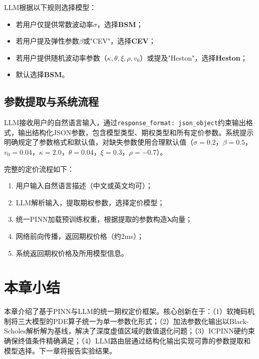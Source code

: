 LLM根据以下规则选择模型：
\begin{itemize}
  \item 若用户仅提供常数波动率$\sigma$，选择\textbf{BSM}；
  \item 若用户提及弹性参数$\beta$或"CEV"，选择\textbf{CEV}；
  \item 若用户提供随机波动率参数（$\kappa,\theta,\xi,\rho,v_0$）或提及"Heston"，选择\textbf{Heston}；
  \item 默认选择\textbf{BSM}。
\end{itemize}

\subsection{参数提取与系统流程}

LLM接收用户的自然语言输入，通过\texttt{response\_format: json\_object}约束输出格式，输出结构化JSON参数，包含模型类型、期权类型和所有定价参数。系统提示明确规定了参数格式和默认值，对缺失参数使用合理默认值（$\sigma=0.2$，$\beta=0.5$，$v_0=0.04$，$\kappa=2.0$，$\theta=0.04$，$\xi=0.3$，$\rho=-0.7$）。

完整的定价流程如下：
\begin{enumerate}
  \item 用户输入自然语言描述（中文或英文均可）；
  \item LLM解析输入，提取期权参数，选择定价模型；
  \item 统一PINN加载预训练权重，根据提取的参数构造$\boldsymbol{\lambda}$向量；
  \item 网络前向传播，返回期权价格（约2ms）；
  \item 系统返回期权价格及所用模型信息。
\end{enumerate}

\section{本章小结}\label{sec:method_summary}

本章介绍了基于PINN与LLM的统一期权定价框架。核心创新在于：（1）软掩码机制将三大模型的PDE算子统一为单一参数化形式；（2）加法参数化输出以Black-Scholes解析解为基线，解决了深度虚值区域的数值退化问题；（3）ICPINN硬约束确保终值条件精确满足；（4）LLM路由层通过结构化输出实现可靠的参数提取和模型选择。下一章将报告实验结果。
